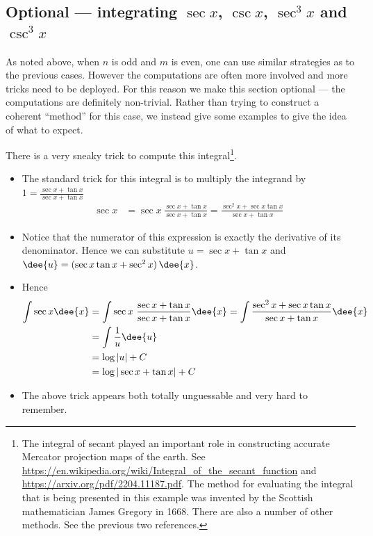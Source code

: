 \subsection{Optional --- integrating $\sec x$, $\csc x$, $\sec^3 x$
                     and $\csc^3 x$}\label{sec:secantEtc}
As noted above, when $n$ is odd and $m$ is even, one can use similar strategies as to the
previous cases. However the computations are often more involved and more tricks
need to be deployed. For this reason we make this section optional --- the
computations are definitely non-trivial. Rather than trying to construct a
coherent ``method'' for this case, we instead give some examples to give the
idea of what to expect.
\begin{eg}\label{eg:TRGINTopta}
\soln There is a very sneaky trick to compute this integral\footnote{The integral of secant played an important role in constructing accurate Mercator projection maps of the earth. See \url{https://en.wikipedia.org/wiki/Integral_of_the_secant_function}
and \url{https://arxiv.org/pdf/2204.11187.pdf}. The method for evaluating the integral that is being presented in this example was invented by the Scottish mathematician James Gregory in 1668. There are also a number of other methods. See the previous two references.}.
\begin{itemize}
 \item The standard trick for this integral is to multiply the
integrand by $1=\frac{\sec x+\tan x}{\sec x+\tan x}$
\begin{align*}
  \sec x &= \sec x\ \frac{\sec x+\tan x}{\sec x+\tan x}
  = \frac{\sec^2x + \sec x \tan x}{\sec x+\tan x}
\end{align*}
\item Notice that the numerator of this expression is exactly the derivative of its
denominator. Hence we can substitute $u=\sec x+\tan x$ and
$\dee{u} = (\sec x\tan x+\sec^2 x)\,\dee{x}$.
\item Hence
\begin{align*}
\int \sec x\dee{x}
&=\int \sec x\ \frac{\sec x+\tan x}{\sec x+\tan x}\dee{x}
=\int \frac{\sec^2 x+\sec x\tan x}{\sec x+\tan x}\dee{x} \\
&=\int \frac{1}{u}\dee{u} \\
&=\log |u|+C \\
&=\log|\sec x+\tan x|+C
\end{align*}
\item
The above trick appears both totally unguessable and very hard to remember.

\end{itemize}
\end{eg}
